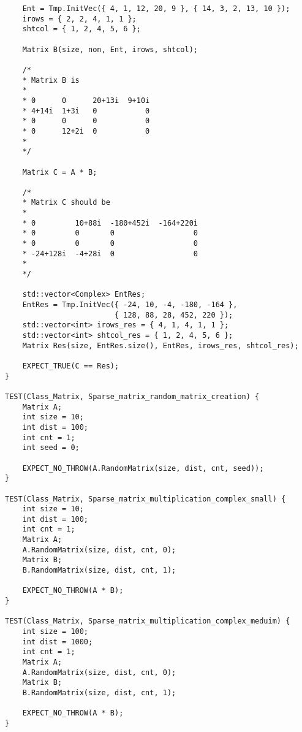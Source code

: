 \documentclass{report}
\begin{document}
\begin{lstlisting}
    Ent = Tmp.InitVec({ 4, 1, 12, 20, 9 }, { 14, 3, 2, 13, 10 });
    irows = { 2, 2, 4, 1, 1 };
    shtcol = { 1, 2, 4, 5, 6 };

    Matrix B(size, non, Ent, irows, shtcol);

    /*
    * Matrix B is
    *
    * 0      0      20+13i  9+10i
    * 4+14i  1+3i   0           0
    * 0      0      0           0
    * 0      12+2i  0           0
    *
    */

    Matrix C = A * B;

    /*
    * Matrix C should be
    *
    * 0         10+88i  -180+452i  -164+220i
    * 0         0       0                  0
    * 0         0       0                  0
    * -24+128i  -4+28i  0                  0
    *
    */

    std::vector<Complex> EntRes;
    EntRes = Tmp.InitVec({ -24, 10, -4, -180, -164 },
                         { 128, 88, 28, 452, 220 });
    std::vector<int> irows_res = { 4, 1, 4, 1, 1 };
    std::vector<int> shtcol_res = { 1, 2, 4, 5, 6 };
    Matrix Res(size, EntRes.size(), EntRes, irows_res, shtcol_res);

    EXPECT_TRUE(C == Res);
}

TEST(Class_Matrix, Sparse_matrix_random_matrix_creation) {
    Matrix A;
    int size = 10;
    int dist = 100;
    int cnt = 1;
    int seed = 0;

    EXPECT_NO_THROW(A.RandomMatrix(size, dist, cnt, seed));
}

TEST(Class_Matrix, Sparse_matrix_multiplication_complex_small) {
    int size = 10;
    int dist = 100;
    int cnt = 1;
    Matrix A;
    A.RandomMatrix(size, dist, cnt, 0);
    Matrix B;
    B.RandomMatrix(size, dist, cnt, 1);

    EXPECT_NO_THROW(A * B);
}

TEST(Class_Matrix, Sparse_matrix_multiplication_complex_meduim) {
    int size = 100;
    int dist = 1000;
    int cnt = 1;
    Matrix A;
    A.RandomMatrix(size, dist, cnt, 0);
    Matrix B;
    B.RandomMatrix(size, dist, cnt, 1);

    EXPECT_NO_THROW(A * B);
}

\end{lstlisting}
\end{document}
